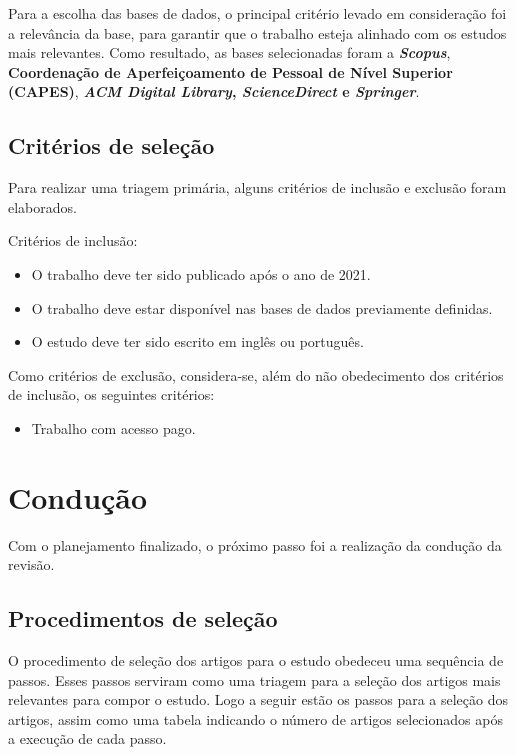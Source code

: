 Para a escolha das bases de dados, o principal critério levado em consideração foi a relevância da base, para garantir que o trabalho esteja alinhado com os estudos mais relevantes. Como resultado, as bases selecionadas foram a \textbf{\textit{Scopus}}, \textbf{Coordenação de Aperfeiçoamento de Pessoal de Nível Superior (CAPES)}, \textbf{\textit{ACM Digital Library}, \textbf{\textit{ScienceDirect}} e \textbf{\textit{Springer}}}.

\subsection{Critérios de seleção}

Para realizar uma triagem primária, alguns critérios de inclusão e exclusão foram elaborados.

Critérios de inclusão:
\begin{itemize}
	\item O trabalho deve ter sido publicado após o ano de 2021.
	
	\item O trabalho deve estar disponível nas bases de dados previamente definidas.
	
	\item O estudo deve ter sido escrito em inglês ou português.
	
\end{itemize}

Como critérios de exclusão, considera-se, além do não obedecimento dos critérios de inclusão, os seguintes critérios:
\begin{itemize}
	\item Trabalho com acesso pago.
\end{itemize}

\section{Condução}

Com o planejamento finalizado, o próximo passo foi a realização da condução da revisão.

\subsection{Procedimentos de seleção}

O procedimento de seleção dos artigos para o estudo obedeceu uma sequência de passos. Esses passos serviram como uma triagem para a seleção dos artigos mais relevantes para compor o estudo. Logo a seguir estão os passos para a seleção dos artigos, assim como uma tabela indicando o número de artigos selecionados após a execução de cada passo.

